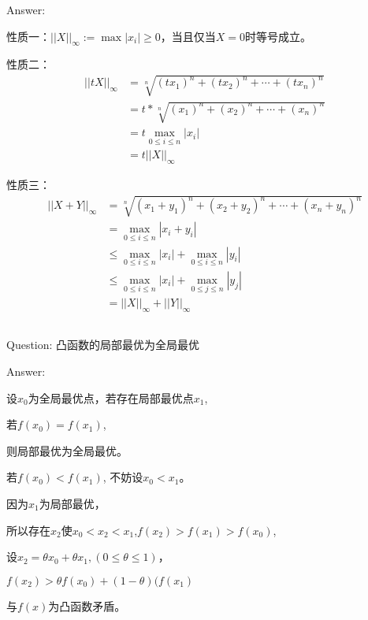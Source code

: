 \documentclass[UTF8]{ctexart}
\begin{document}
Answer:

性质一：$|\lvert X |\lvert_\infty := \max|x_i| \ge 0$，当且仅当$X = 0$时等号成立。

性质二：
\begin{align}\nonumber
|\lvert tX |\lvert_\infty &= \sqrt[n]{(tx_1)^n + (tx_2)^n + \cdots +(tx_n)^n} \\  \nonumber
                          &= t * \sqrt[n]{(x_1)^n + (x_2)^n + \cdots +(x_n)^n} \\  \nonumber         
                          &= t\max \limits_{0\leq i \leq n}|x_i|               \\   \nonumber
                          &= t|\lvert X |\lvert_\infty
\end{align}

性质三：
\begin{align}\nonumber
|\lvert X + Y |\lvert_\infty &= \sqrt[n]{(x_1 + y_1)^n + (x_2 + y_2)^n + \cdots +(x_n + y_n)^n} \\  \nonumber
                             &= \max \limits_{0\leq i \leq n}|x_i + y_i|                        \\  \nonumber
                       &\leq \max \limits_{0\leq i \leq n}|x_i| + \max \limits_{0\leq i \leq n}|y_i| \\ \nonumber
               &\leq \max \limits_{0\leq i \leq n}|x_i| + \max \limits_{0\leq j \leq n}|y_j| \\ \nonumber
                       &= |\lvert X |\lvert_\infty + |\lvert Y |\lvert_\infty
\end{align}
\subsection{}
Question:
凸函数的局部最优为全局最优

Answer:

设$x_0$为全局最优点，若存在局部最优点$x_1$,

若$f(x_0) = f(x_1)$,

则局部最优为全局最优。

若$f(x_0) < f(x_1)$,
不妨设$x_0 < x_1$。

因为$x_1$为局部最优，

所以存在$x_2$使$x_0 < x_2 <x_1$,$f(x_2) > f(x_1) > f(x_0)$,

设$x_2 = \theta x_0 +  \theta x_1,(0 \leq \theta \leq 1)$，

$f(x_2) > \theta f(x_0) + (1 - \theta)(f(x_1)$

与$f(x)$为凸函数矛盾。
\end{document}
